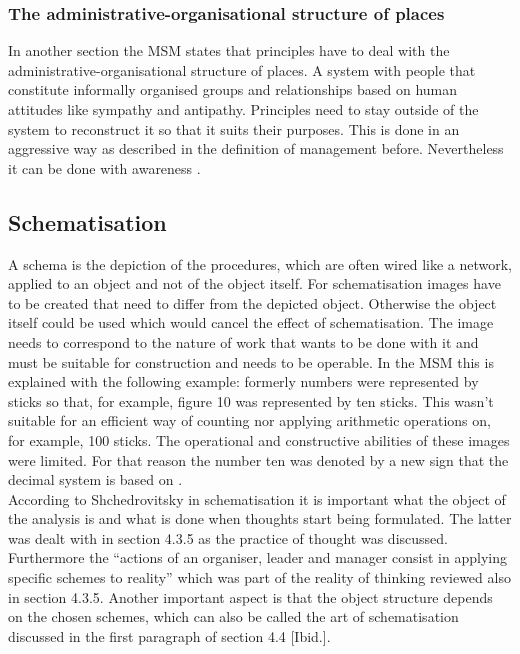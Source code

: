 \documentclass[11pt,a4paper]{article}
\begin{document}
\subsubsection{The administrative-organisational structure of places}
In another section the MSM states that principles have to deal with the \linebreak administrative-organisational structure of places. A system with people that constitute informally organised groups and relationships based on human attitudes like sympathy and antipathy. Principles need to stay outside of the system to reconstruct it so that it suits their purposes. This is done in an aggressive way as described in the definition of management before. Nevertheless it can be done with awareness \linebreak \cite[p. 82]{MSM}.

\subsection{Schematisation}
A schema is the depiction of the procedures, which are often wired like a network, applied to an object and not of the object itself. For schematisation images have to be created that need to differ from the depicted object. Otherwise the object itself could be used which would cancel the effect of schematisation. The image needs to correspond to the nature of work that wants to be done with it and must be suitable for construction and needs to be operable. In the MSM this is explained with the following example: formerly numbers were represented by sticks so that, for example, figure 10 was represented by ten sticks. This wasn’t suitable for an efficient way of counting nor applying arithmetic operations on, for example, 100 sticks. The operational and constructive abilities of these images were limited. For that reason the number ten was denoted by a new sign that the decimal system is based on \cite[p. 110f.]{MSM}. \\
According to Shchedrovitsky in schematisation it is important what the object of the analysis is and what is done when thoughts start being formulated. The latter was dealt with in section 4.3.5 as the practice of thought was discussed. Furthermore the “actions of an organiser, leader and manager consist in applying specific schemes to reality” \cite[p. 83.]{MSM} which was part of the reality of thinking reviewed also in section 4.3.5. Another important aspect is that the object structure depends on the chosen schemes, which can also be called the art of schematisation discussed in the first paragraph of section 4.4 [Ibid.].
\end{document}
